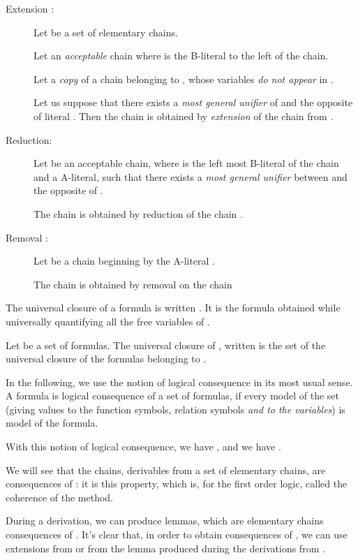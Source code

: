 \documentclass{article}
\begin{document}
\begin{description}
\item [Extension :]
Let  be a set of elementary chains. 

Let  an \emph{acceptable} chain where  is the B-literal to the left of the chain.

Let  a \emph{copy} of a chain belonging to , whose variables  \emph{do not appear}
in .  

Let us suppose that there exists  a \emph{most general unifier} of  and the opposite of literal . 
Then the chain   is obtained by \emph{extension} of the chain  from  .


\item [Reduction:]
Let  be an acceptable chain, where  is the left most B-literal of the chain and  a A-literal,
such that there exists a \emph{most general unifier}  between  and the opposite of .

The chain  is obtained by reduction of the chain .

\item [Removal :]
Let  be a chain beginning by the A-literal .

The chain  is obtained by removal on the chain  

\end{description}


The universal closure of a formula  is written . It is the formula obtained while universally quantifying all the
free variables of .

Let  be a set of formulas. The universal closure of , written  
is the set of the universal closure of the formulas belonging to .

In the following, we use the notion of logical consequence in its most usual sense. A formula is logical consequence of a set
of formulas, if every model of the set (giving values to the function symbols, relation symbols \emph{and to the variables})
is model of the formula.

With this notion of logical consequence, we have 
 , and we have .

We will see that the chains, derivables from a set  of elementary chains, are consequences of  : it is
this property, which is, for the first order logic, called the coherence of the method.

During a derivation, we can produce lemmas, which are elementary chains consequences of  .
It's clear that, in order to obtain consequences of , we can use extensions from  or from
the lemma produced during the derivations from .
\end{document}
